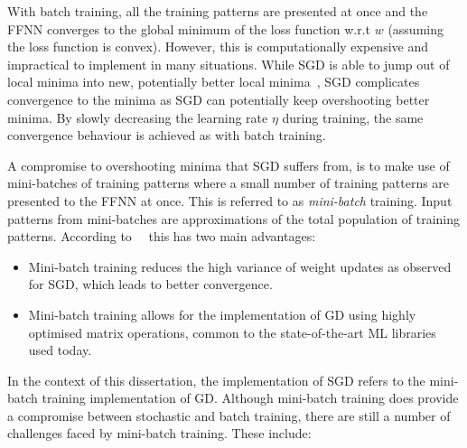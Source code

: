 \noindent
With batch training, all the training patterns are presented at once and the \acs{FFNN} converges to the global minimum of the loss function w.r.t $w$ (assuming the loss function is convex). However, this is computationally expensive and impractical to implement in many situations. While \acs{SGD} is able to jump out of local minima into new, potentially better local minima~\cite{ref:ruder:2016}, \acs{SGD} complicates convergence to the minima as \acs{SGD} can potentially keep overshooting better minima. By slowly decreasing the learning rate $\eta$ during training, the same convergence behaviour is achieved as with batch training.

A compromise to overshooting minima that \acs{SGD} suffers from, is to make use of mini-batches of training patterns where a small number of training patterns are presented to the \acs{FFNN} at once. This is referred to as \textit{mini-batch} training. Input patterns from mini-batches are approximations of the total population of training patterns. According to~\citeauthor{ref:ruder:2016}~\cite{ref:ruder:2016} this has two main advantages:

\begin{itemize}
      \item Mini-batch training reduces the high variance of weight updates as observed for \acs{SGD}, which leads to better convergence.

      \item Mini-batch training allows for the implementation of \acs{GD} using highly optimised matrix operations, common to the state-of-the-art \acs{ML} libraries used today.
\end{itemize}

\noindent
In the context of this dissertation, the implementation of \acs{SGD} refers to the mini-batch training implementation of \acs{GD}. Although mini-batch training does provide a compromise between stochastic and batch training, there are still a number of challenges faced by mini-batch training. These include:

